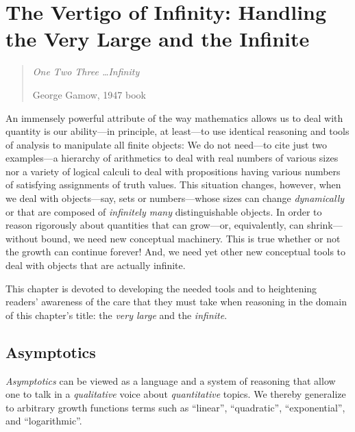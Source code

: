 
\chapter{The Vertigo of Infinity:
Handling the Very Large and the Infinite}
\label{ch:infinity}

\begin{quote}
{\em One Two Three \ldots Infinity}

\hspace*{.75in}George Gamow, 1947 book
\end{quote}

\medskip

\noindent
An immensely powerful attribute of the way mathematics allows us to deal with quantity is our ability---in principle, at least---to use identical reasoning and tools of analysis to manipulate all finite objects: We do not need---to cite just two examples---a hierarchy of arithmetics to deal with real numbers of various sizes nor a variety of logical calculi to deal with propositions having various numbers of satisfying assignments of truth values.  This situation changes, however, when we deal with objects---say, sets or numbers---whose sizes can change {\em dynamically} or that are composed of {\em infinitely many} distinguishable objects.  In order to reason rigorously about quantities that can grow---or, equivalently, can shrink---without bound, we need new conceptual machinery.  This is true whether or not the growth can continue forever!  And, we need yet other new conceptual tools to deal with objects that are actually infinite.

\smallskip

This chapter is devoted to developing the needed tools and to heightening readers' awareness of the care that they must take when reasoning in the domain of this chapter's title: the {\em very large} and the {\em infinite}.

\section{Asymptotics}
\label{sec:asymptotics}

{\em Asymptotics} can be viewed as a language and a system of reasoning that allow one to talk in a {\em qualitative} voice about {\em quantitative} topics.  We thereby generalize to arbitrary growth functions terms such as ``linear'', ``quadratic'', ``exponential'', and ``logarithmic''.

